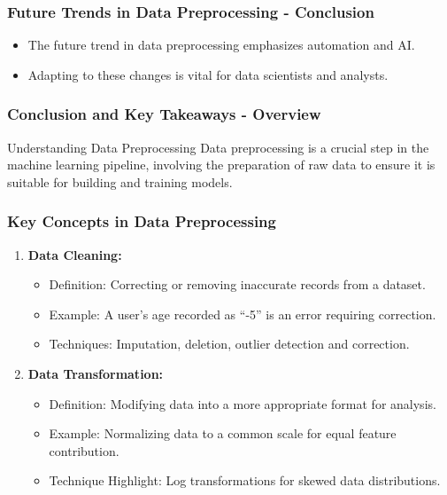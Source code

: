 \documentclass[aspectratio=169]{beamer}
\begin{document}
\begin{frame}[fragile]
    \frametitle{Future Trends in Data Preprocessing - Conclusion}
    \begin{itemize}
        \item The future trend in data preprocessing emphasizes automation and AI.
        \item Adapting to these changes is vital for data scientists and analysts.
    \end{itemize}
\end{frame}

\begin{frame}[fragile]
    \frametitle{Conclusion and Key Takeaways - Overview}
    \begin{block}{Understanding Data Preprocessing}
        Data preprocessing is a crucial step in the machine learning pipeline, involving the preparation of raw data to ensure it is suitable for building and training models.
    \end{block}
\end{frame}

\begin{frame}[fragile]
    \frametitle{Key Concepts in Data Preprocessing}
    \begin{enumerate}
        \item \textbf{Data Cleaning:}
        \begin{itemize}
            \item Definition: Correcting or removing inaccurate records from a dataset.
            \item Example: A user’s age recorded as “-5” is an error requiring correction.
            \item Techniques: Imputation, deletion, outlier detection and correction.
        \end{itemize}
        
        \item \textbf{Data Transformation:}
        \begin{itemize}
            \item Definition: Modifying data into a more appropriate format for analysis.
            \item Example: Normalizing data to a common scale for equal feature contribution.
            \item Technique Highlight: Log transformations for skewed data distributions.
        \end{itemize}
    \end{enumerate}
\end{frame}
\end{document}
